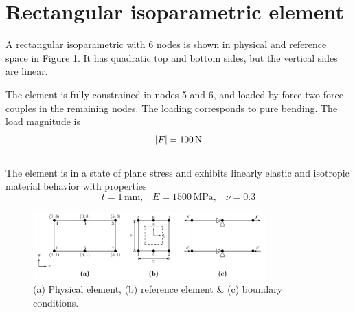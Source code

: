 \documentclass{article}
\begin{document}

\section*{Rectangular isoparametric element}
A rectangular isoparametric with 6 nodes is shown in physical and reference space in Figure 1. It has quadratic top and bottom sides, but the vertical sides are linear. 

The element is fully constrained in nodes 5 and 6, and loaded by force two force couples in the remaining nodes. The loading corresponds to pure bending. The load magnitude is 
\vspace{0.3cm}
\[\abs{F} = 100 \, \text{N}\]
\\
The element is in a state of plane stress and exhibits linearly elastic and isotropic material behavior with properties 
\vspace{0.3cm}
\[t = 1 \, \text{mm,} \quad E = 1500 \, \text{MPa,} \quad \nu = 0.3\]
\begin{figure}[H]
    \centering
    \includegraphics[width=0.8\textwidth]{Photos/ProbFig.png}
    \caption{(a) Physical element, (b) reference element \& (c) boundary conditions.}
    \label{fig:P1}
\end{figure}
\end{document}
